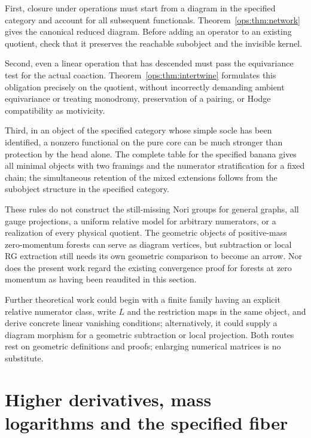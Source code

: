 \documentclass[11pt,a4paper,oneside]{article}
\theoremstyle{plain}
\theoremstyle{definition}
\theoremstyle{remark}
\newcommand{\Q}{\mathbb Q}
\newcommand{\C}{\mathbb C}
\newcommand{\Gr}{\operatorname{Gr}}
\newcommand{\Res}{\operatorname{Res}}
\newcommand{\dR}{\mathrm{dR}}
\numberwithin{equation}{section}
\begin{document}
First, closure under operations must start from a diagram in the specified category and account for all subsequent functionals.
Theorem~\ref{ops:thm:network} gives the canonical reduced diagram.
Before adding an operator to an existing quotient, check that it preserves the reachable subobject and the invisible kernel.

Second, even a linear operation that has descended must pass the equivariance test for the actual coaction.
Theorem~\ref{ops:thm:intertwine} formulates this obligation precisely on the quotient,
without incorrectly demanding ambient equivariance or treating monodromy, preservation of a pairing, or Hodge compatibility as motivicity.

Third, in an object of the specified category whose simple socle has been identified,
a nonzero functional on the pure core can be much stronger than protection by the head alone.
The complete table for the specified banana gives all minimal objects with two framings and the numerator stratification for a fixed chain;
the simultaneous retention of the mixed extensions follows from the subobject structure in the specified category.

These rules do not construct the still-missing Nori groups for general graphs, all gauge projections,
a uniform relative model for arbitrary numerators, or a realization of every physical quotient.
The geometric objects of positive-mass zero-momentum forests can serve as diagram vertices,
but subtraction or local RG extraction still needs its own geometric comparison to become an arrow.
Nor does the present work regard the existing convergence proof for forests at zero momentum as having been reaudited in this section.

Further theoretical work could begin with a finite family having an explicit relative numerator class,
write $L$ and the restriction maps in the same object, and derive concrete linear vanishing conditions;
alternatively, it could supply a diagram morphism for a geometric subtraction or local projection.
Both routes rest on geometric definitions and proofs; enlarging numerical matrices is no substitute.



\endgroup


\section{Higher derivatives, mass logarithms and the specified fiber}\label{supp:deriv}
\begingroup
\providecommand{\Q}{\mathbb Q}
\providecommand{\C}{\mathbb C}
\providecommand{\dR}{\mathrm{dR}}
\providecommand{\Ann}{\operatorname{Ann}}
\providecommand{\Gr}{\operatorname{Gr}}
\providecommand{\Res}{\operatorname{Res}}
\providecommand{\rk}{\operatorname{rk}}
\providecommand{\cE}{\mathcal E}
\providecommand{\cM}{\mathcal M}
\end{document}
